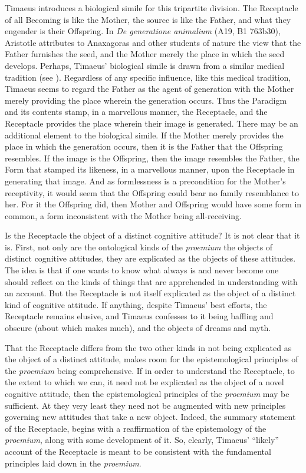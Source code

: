Timaeus introduces a biological simile for this tripartite division. The Receptacle of all Becoming is like the Mother, the source is like the Father, and what they engender is their Offspring.  In \emph{De generatione animalium} (A19, B1 763b30), Aristotle attributes to Anaxagoras and other students of nature the view that the Father furnishes the seed, and the Mother merely the place in which the seed develops. Perhaps, Timaeus' biological simile is drawn from a similar medical tradition (see \citealt[187]{Cornford:1935fk}). Regardless of any specific influence, like this medical tradition, Timaeus seems to regard the Father as the agent of generation with the Mother merely providing the place wherein the generation occurs. Thus the Paradigm and its contents stamp, in a marvellous manner, the Receptacle, and the Receptacle provides the place wherein their image is generated. There may be an additional element to the biological simile. If the Mother merely provides the place in which the generation occurs, then it is the Father that the Offspring resembles. If the image is the Offspring, then the image resembles the Father, the Form that stamped its likeness, in a marvellous manner, upon the Receptacle in generating that image. And as formlessness is a precondition for the Mother's receptivity, it would seem that the Offspring could bear no family resemblance to her. For it the Offspring did, then Mother and Offspring would have some form in common, a form inconsistent with the Mother being all-receiving. 

Is the Receptacle the object of a distinct cognitive attitude? It is not clear that it is. First, not only are the ontological kinds of the \emph{proemium} the objects of distinct cognitive attitudes, they are explicated as the objects of these attitudes. The idea is that if one wants to know what always is and never become one should reflect on the kinds of things that are apprehended in understanding with an account. But the Receptacle is not itself explicated as the object of a distinct kind of cognitive attitude. If anything, despite Timaeus' best efforts, the Receptacle remains elusive, and Timaeus confesses to it being baffling and obscure (about which \citealt{Derrida:1993aa} makes much), and the objects of dreams and myth.

That the Receptacle differs from the two other kinds in not being explicated as the object of a distinct attitude, makes room for the epistemological principles of the \emph{proemium} being comprehensive. If in order to understand the Receptacle, to the extent to which we can, it need not be explicated as the object of a novel cognitive attitude, then the epistemological principles of the \emph{proemium} may be sufficient. At they very least they need not be augmented with new principles governing new attitudes that take a new object. Indeed, the summary statement of the Receptacle, begins with a reaffirmation of the epistemology of the \emph{proemium}, along with some development of it. So, clearly, Timaeus' ``likely'' account of the Receptacle is meant to be consistent with the fundamental principles laid down in the \emph{proemium}.

